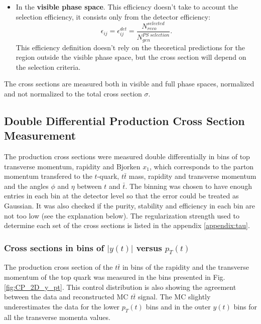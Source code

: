 \begin{itemize}
 \item In the \textbf{visible phase space}. This efficiency doesn't take to account the selection efficiency, it consists only from the detector efficiency:
 \begin{equation}
  \epsilon_{ij} = \epsilon_{ij}^{det} = \frac{N^{selected}_{reco}}{N^{PS\;selection}_{gen}}.
 \end{equation}
 This efficiency definition doesn't rely on the theoretical predictions for the region outside the visible phase space, but the cross section will depend on
 the selection criteria.
\end{itemize}

The cross sections are measured both in visible and full phase spaces, normalized and not normalized to the total cross section $\sigma$. 


\subsection{Double Differential Production Cross Section Measurement}

The production cross sections were measured double differentially in bins of top transverse momentum, rapidity and Bjorken $x_{1}$,
which corresponds to the parton momentum transfered to the $t$-quark,
$t\bar{t}$ mass, rapidity and transverse momentum and the angles $\phi$ and $\eta$ between $t$ and $\bar{t}$.
The binning was chosen to have enough entries in each bin at the detector level so that the error could be treated as Gaussian.
It was also checked if the purity, stability and efficiency in each bin are not too low (see the explanation below).
The regularization strength used to determine each set of the cross sections is listed in the appendix \ref{appendix:tau}.

\subsubsection{Cross sections in bins of $|y(t)|$ versus $p_{T}(t)$}

The production cross section of the $t\bar{t}$ in bins of the rapidity and the transverse momentum of the top quark was
measured in the bins presented in Fig. \ref{fig:CP_2D_y_pt}. This control distribution is also showing the agreement between 
the data and reconstructed MC $t\bar{t}$ signal. The MC slightly underestimates the data for the lower $p_{T}(t)$ bins and 
in the outer $y(t)$ bins for all the transverse momenta values.

